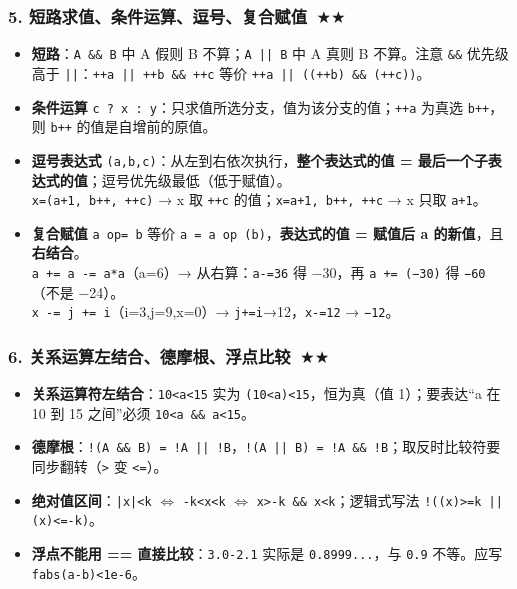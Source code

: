 \documentclass[UTF8,zihao=-4,a4paper]{ctexart}
\newcommand{\cstar}{\textcolor{deepred}{$\bigstar$}}
\begin{document}
\subsubsection*{5. 短路求值、条件运算、逗号、复合赋值\ \cstar\cstar}
\begin{itemize}
  \item \textbf{短路}：\texttt{A \&\& B} 中 A 假则 B 不算；\texttt{A || B} 中 A 真则 B 不算。注意 \texttt{\&\&} 优先级高于 \texttt{||}：\texttt{++a || ++b \&\& ++c} 等价 \texttt{++a || ((++b) \&\& (++c))}。
  \item \textbf{条件运算} \texttt{c ? x : y}：只求值所选分支，值为该分支的值；\texttt{++a} 为真选 \texttt{b++}，则 \texttt{b++} 的值是自增前的原值。
  \item \textbf{逗号表达式} \texttt{(a,b,c)}：从左到右依次执行，\textbf{整个表达式的值 = 最后一个子表达式的值}；逗号优先级最低（低于赋值）。\\
  \texttt{x=(a+1, b++, ++c)} → x 取 \texttt{++c} 的值；\texttt{x=a+1, b++, ++c} → x 只取 \texttt{a+1}。
  \item \textbf{复合赋值} \texttt{a op= b} 等价 \texttt{a = a op (b)}，\textbf{表达式的值 = 赋值后 a 的新值}，且\textbf{右结合}。\\
  \texttt{a += a -= a*a}（a=6）→ 从右算：\texttt{a-=36} 得 −30，再 \texttt{a += (−30)} 得 \texttt{−60}（不是 −24）。\\
  \texttt{x -= j += i}（i=3,j=9,x=0）→ \texttt{j+=i}→12，\texttt{x-=12} → \texttt{−12}。
\end{itemize}

\subsubsection*{6. 关系运算左结合、德摩根、浮点比较\ \cstar\cstar}
\begin{itemize}
  \item \textbf{关系运算符左结合}：\texttt{10<a<15} 实为 \texttt{(10<a)<15}，恒为真（值 1）；要表达“a 在 10 到 15 之间”必须 \texttt{10<a \&\& a<15}。
  \item \textbf{德摩根}：\texttt{!(A \&\& B) = !A || !B}，\texttt{!(A || B) = !A \&\& !B}；取反时比较符要同步翻转（\texttt{>} 变 \texttt{<=}）。
  \item \textbf{绝对值区间}：\texttt{|x|<k} $\Longleftrightarrow$ \texttt{-k<x<k} $\Longleftrightarrow$ \texttt{x>-k \&\& x<k}；逻辑式写法 \texttt{!((x)>=k || (x)<=-k)}。
  \item \textbf{浮点不能用 == 直接比较}：\texttt{3.0-2.1} 实际是 \texttt{0.8999...}，与 \texttt{0.9} 不等。应写 \texttt{fabs(a-b)<1e-6}。
\end{itemize}
\end{document}
